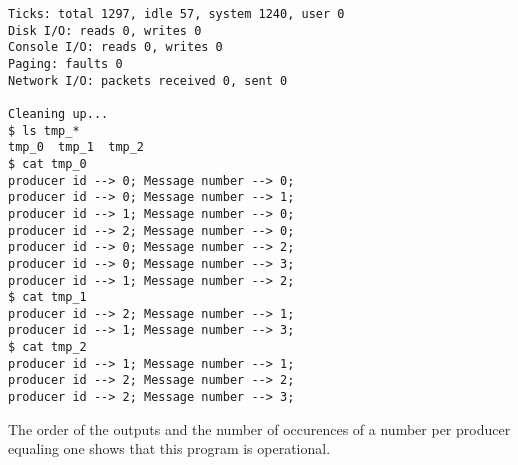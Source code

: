 \documentclass[11pt]{article}
\begin{document}
\begin{question}
\begin{verbatim}
Ticks: total 1297, idle 57, system 1240, user 0
Disk I/O: reads 0, writes 0
Console I/O: reads 0, writes 0
Paging: faults 0
Network I/O: packets received 0, sent 0

Cleaning up...
$ ls tmp_*
tmp_0  tmp_1  tmp_2
$ cat tmp_0
producer id --> 0; Message number --> 0;
producer id --> 0; Message number --> 1;
producer id --> 1; Message number --> 0;
producer id --> 2; Message number --> 0;
producer id --> 0; Message number --> 2;
producer id --> 0; Message number --> 3;
producer id --> 1; Message number --> 2;
$ cat tmp_1
producer id --> 2; Message number --> 1;
producer id --> 1; Message number --> 3;
$ cat tmp_2
producer id --> 1; Message number --> 1;
producer id --> 2; Message number --> 2;
producer id --> 2; Message number --> 3;
    \end{verbatim}

    The order of the outputs and the number of occurences of a number per producer equaling one shows that this program is operational.

\end{question}
\end{document}
